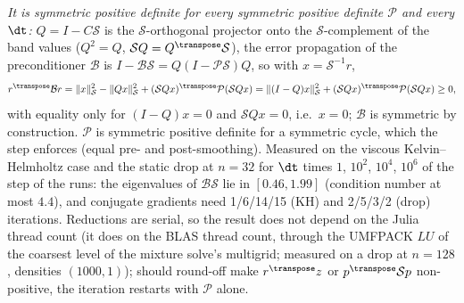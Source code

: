 \emph{It is symmetric positive definite for every symmetric positive definite
$\mathcal P$ and every $\dt$:} $Q=I-C\mathcal S$ is the $\mathcal S$-orthogonal
projector onto the $\mathcal S$-complement of the band values ($Q^2=Q$,
$\mathcal SQ=Q^{\transpose}\mathcal S$), the error propagation of the
preconditioner $\mathcal B$ is $I-\mathcal B\mathcal S=Q(I-\mathcal P\mathcal S)Q$,
so with $x=\mathcal S^{-1}r$,
\[
  r^{\transpose}\mathcal Br=\norm{x}_{\mathcal S}^2-\norm{Qx}_{\mathcal S}^2
  +(\mathcal SQx)^{\transpose}\mathcal P(\mathcal SQx)
  =\norm{(I-Q)x}_{\mathcal S}^2+(\mathcal SQx)^{\transpose}\mathcal P(\mathcal SQx)\ge0,
\]
with equality only for $(I-Q)x=0$ and $\mathcal SQx=0$, i.e.\ $x=0$; $\mathcal B$ is
symmetric by construction. $\mathcal P$ is symmetric positive definite for a
symmetric cycle, which the step enforces (equal pre- and post-smoothing).
Measured on the viscous Kelvin--Helmholtz case  and the static
drop at $n=32$ for $\dt$ times $1$, $10^2$, $10^4$, $10^6$ of the step of the
runs: the eigenvalues of $\mathcal B\mathcal S$ lie in $[0.46,1.99]$ (condition
number at most $4.4$), and conjugate gradients need 1/6/14/15 (KH) and
2/5/3/2 (drop) iterations. Reductions are serial, so the result does not depend
on the Julia thread count (it does on the BLAS thread count, through the
UMFPACK $LU$ of the coarsest level of the mixture solve's multigrid; measured
on a drop at $n=128$, densities $(1000,1)$); should round-off make $r^{\transpose}z$ or
$p^{\transpose}\mathcal Sp$ non-positive, the iteration restarts with
$\mathcal P$ alone.

